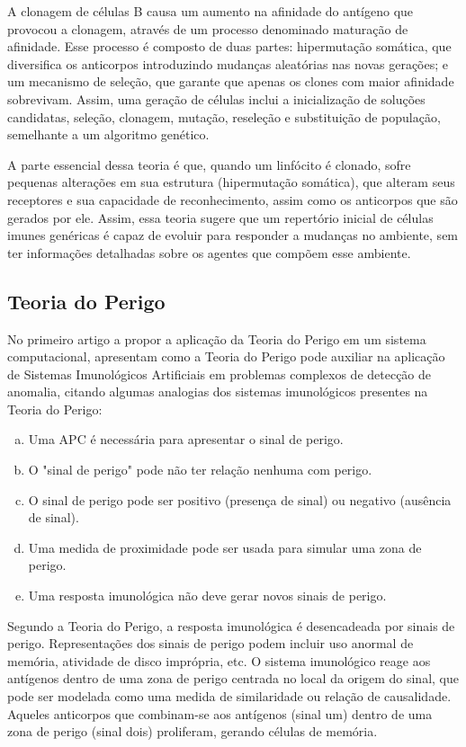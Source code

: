 A clonagem de células B causa um aumento na afinidade do antígeno que provocou a clonagem, através de um processo denominado maturação de afinidade. Esse processo é composto de duas partes: hipermutação somática, que diversifica os anticorpos introduzindo mudanças aleatórias nas novas gerações; e um mecanismo de seleção, que garante que apenas os clones com maior afinidade sobrevivam. Assim, uma geração de células inclui a inicialização de soluções candidatas, seleção, clonagem, mutação, reseleção e substituição de população, semelhante a um algoritmo genético.

A parte essencial dessa teoria é que, quando um linfócito é clonado, sofre pequenas alterações em sua estrutura (hipermutação somática), que alteram seus receptores e sua capacidade de reconhecimento, assim como os anticorpos que são gerados por ele. Assim, essa teoria sugere que um repertório inicial de células imunes genéricas é capaz de evoluir para responder a mudanças no ambiente, sem ter informações detalhadas sobre os agentes que compõem esse ambiente.

\subsection{Teoria do Perigo}

No primeiro artigo a propor a aplicação da Teoria do Perigo em um sistema computacional, \citet{Aickelin2002} apresentam como a Teoria do Perigo pode auxiliar na aplicação de Sistemas Imunológicos Artificiais em problemas complexos de detecção de anomalia, citando algumas analogias dos sistemas imunológicos presentes na Teoria do Perigo:

\begin{enumerate}[a)]
    \item Uma APC é necessária para apresentar o sinal de perigo.
    \item O "sinal de perigo" pode não ter relação nenhuma com perigo.
    \item O sinal de perigo pode ser positivo (presença de sinal) ou negativo (ausência de sinal).
    \item Uma medida de proximidade pode ser usada para simular uma zona de perigo.
    \item Uma resposta imunológica não deve gerar novos sinais de perigo.
\end{enumerate}

Segundo a Teoria do Perigo, a resposta imunológica é desencadeada por sinais de perigo. Representações dos sinais de perigo podem incluir uso anormal de memória, atividade de disco imprópria, etc. O sistema imunológico reage aos antígenos dentro de uma zona de perigo centrada no local da origem do sinal, que pode ser modelada como uma medida de similaridade ou relação de causalidade. Aqueles anticorpos que combinam-se aos antígenos (sinal um) dentro de uma zona de perigo (sinal dois) proliferam, gerando células de memória.

